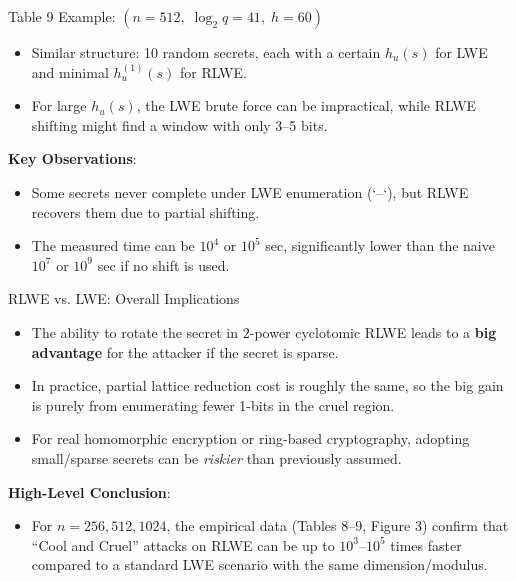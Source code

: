\documentclass{beamer}
\begin{document}
\begin{frame}{Table 9 Example: $(n=512,\;\log_2 q=41,\;h=60)$}
  \footnotesize
  \begin{itemize}
    \item Similar structure: 10 random secrets, each with a certain $h_u(s)$ for LWE and minimal $h_u^{(1)}(s)$ for RLWE.
    \item For large $h_u(s)$, the LWE brute force can be impractical, while RLWE shifting might find a window with only 3--5 bits.
  \end{itemize}
  \vspace{0.2cm}
  \textbf{Key Observations}:
  \begin{itemize}
    \item Some secrets never complete under LWE enumeration (`--`), but RLWE recovers them due to partial shifting.
    \item The measured time can be $10^4$ or $10^5$ sec, significantly lower than the naive $10^7$ or $10^9$ sec if no shift is used.
  \end{itemize}
\end{frame}

\begin{frame}{RLWE vs. LWE: Overall Implications}
  \begin{itemize}
    \item The ability to rotate the secret in $2$-power cyclotomic RLWE leads to a \textbf{big advantage} for the attacker if the secret is sparse.
    \item In practice, partial lattice reduction cost is roughly the same, so the big gain is purely from enumerating fewer 1-bits in the cruel region.
    \item For real homomorphic encryption or ring-based cryptography, adopting small/sparse secrets can be \emph{riskier} than previously assumed.
  \end{itemize}

  \vspace{0.3cm}
  \textbf{High-Level Conclusion}:
  \begin{itemize}
    \item For $n=256, 512, 1024$, the empirical data (Tables 8--9, Figure 3) confirm that ``Cool and Cruel'' attacks on RLWE can be up to $10^3$--$10^5$ times faster compared to a standard LWE scenario with the same dimension/modulus.
  \end{itemize}
\end{frame}
\end{document}
